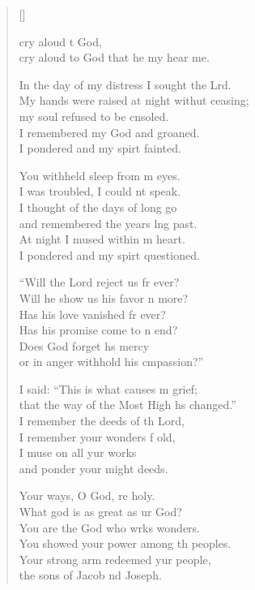 \settowidth{\versewidth}{My hands were raised at night without ceasing;}
\begin{verse}[\versewidth]
  \begin{patverse}
     cry aloud t God,\Med\\
cry aloud to God that he my hear me.

In the day of my distress I sought the Lrd.\Flex\\
My hands were raised at night withut ceasing;\Med\\
my soul refused to be cnsoled.\\
I remembered my God and  groaned.\Med\\
I pondered and my spir\pointup{\i}t fainted.

You withheld sleep from m eyes.\Med\\
I was troubled, I could nt speak.\\
I thought of the days of long go\Med\\
and remembered the years lng past.\\
At night I mused within m heart.\Med\\
I pondered and my spir\pointup{\i}t questioned.

“Will the Lord reject us fr ever?\Med\\
Will he show us his favor n more?\\
Has his love vanished fr ever?\Med\\
Has his promise come to n end?\\
Does God forget h\pointup{\i}s mercy\Med\\
or in anger withhold his cmpassion?”

I said: “This is what causes m grief;\Med\\
that the way of the Most High hs changed.”\\
I remember the deeds of th Lord,\Med\\
I remember your wonders f old,\\
I muse on all yur works\Med\\
and ponder your might deeds.

Your ways, O God, re holy.\Med\\
What god is as great as ur God?\\
You are the God who wrks wonders.\Med\\
You showed your power among th peoples.\\
Your strong arm redeemed yur people,\Med\\
the sons of Jacob nd Joseph.


\end{patverse}
\end{verse}
